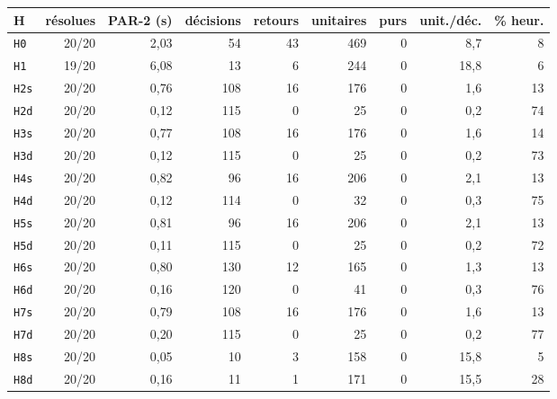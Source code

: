 \begin{tabular}{lrrrrrrrr}
\toprule
H & résolues & PAR-2 (s) & décisions & retours & unitaires & purs & unit./déc. & \% heur. \\
\midrule
\texttt{H0} & 20/20 & 2{,}03 & 54 & 43 & 469 & 0 & 8{,}7 & 8 \\
\texttt{H1} & 19/20 & 6{,}08 & 13 & 6 & 244 & 0 & 18{,}8 & 6 \\
\texttt{H2s} & 20/20 & 0{,}76 & 108 & 16 & 176 & 0 & 1{,}6 & 13 \\
\texttt{H2d} & 20/20 & 0{,}12 & 115 & 0 & 25 & 0 & 0{,}2 & 74 \\
\texttt{H3s} & 20/20 & 0{,}77 & 108 & 16 & 176 & 0 & 1{,}6 & 14 \\
\texttt{H3d} & 20/20 & 0{,}12 & 115 & 0 & 25 & 0 & 0{,}2 & 73 \\
\texttt{H4s} & 20/20 & 0{,}82 & 96 & 16 & 206 & 0 & 2{,}1 & 13 \\
\texttt{H4d} & 20/20 & 0{,}12 & 114 & 0 & 32 & 0 & 0{,}3 & 75 \\
\texttt{H5s} & 20/20 & 0{,}81 & 96 & 16 & 206 & 0 & 2{,}1 & 13 \\
\texttt{H5d} & 20/20 & 0{,}11 & 115 & 0 & 25 & 0 & 0{,}2 & 72 \\
\texttt{H6s} & 20/20 & 0{,}80 & 130 & 12 & 165 & 0 & 1{,}3 & 13 \\
\texttt{H6d} & 20/20 & 0{,}16 & 120 & 0 & 41 & 0 & 0{,}3 & 76 \\
\texttt{H7s} & 20/20 & 0{,}79 & 108 & 16 & 176 & 0 & 1{,}6 & 13 \\
\texttt{H7d} & 20/20 & 0{,}20 & 115 & 0 & 25 & 0 & 0{,}2 & 77 \\
\texttt{H8s} & 20/20 & 0{,}05 & 10 & 3 & 158 & 0 & 15{,}8 & 5 \\
\texttt{H8d} & 20/20 & 0{,}16 & 11 & 1 & 171 & 0 & 15{,}5 & 28 \\
\bottomrule
\end{tabular}
